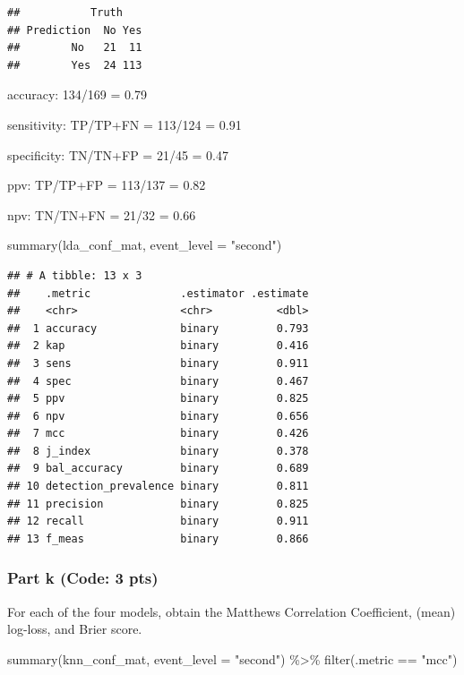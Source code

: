 \documentclass[
]{article}
\newenvironment{Shaded}{\begin{snugshade}}{\end{snugshade}}
\newcommand{\AttributeTok}[1]{\textcolor[rgb]{0.77,0.63,0.00}{#1}}
\newcommand{\FunctionTok}[1]{\textcolor[rgb]{0.00,0.00,0.00}{#1}}
\newcommand{\NormalTok}[1]{#1}
\newcommand{\SpecialCharTok}[1]{\textcolor[rgb]{0.00,0.00,0.00}{#1}}
\newcommand{\StringTok}[1]{\textcolor[rgb]{0.31,0.60,0.02}{#1}}
\begin{document}
\begin{verbatim}
##           Truth
## Prediction  No Yes
##        No   21  11
##        Yes  24 113
\end{verbatim}

accuracy: 134/169 = 0.79

sensitivity: TP/TP+FN = 113/124 = 0.91

specificity: TN/TN+FP = 21/45 = 0.47

ppv: TP/TP+FP = 113/137 = 0.82

npv: TN/TN+FN = 21/32 = 0.66

\begin{Shaded}
\begin{Highlighting}[]
\FunctionTok{summary}\NormalTok{(lda\_conf\_mat, }\AttributeTok{event\_level =} \StringTok{"second"}\NormalTok{)}
\end{Highlighting}
\end{Shaded}

\begin{verbatim}
## # A tibble: 13 x 3
##    .metric              .estimator .estimate
##    <chr>                <chr>          <dbl>
##  1 accuracy             binary         0.793
##  2 kap                  binary         0.416
##  3 sens                 binary         0.911
##  4 spec                 binary         0.467
##  5 ppv                  binary         0.825
##  6 npv                  binary         0.656
##  7 mcc                  binary         0.426
##  8 j_index              binary         0.378
##  9 bal_accuracy         binary         0.689
## 10 detection_prevalence binary         0.811
## 11 precision            binary         0.825
## 12 recall               binary         0.911
## 13 f_meas               binary         0.866
\end{verbatim}

\hypertarget{part-k-code-3-pts}{%
\subsubsection{Part k (Code: 3 pts)}\label{part-k-code-3-pts}}

For each of the four models, obtain the Matthews Correlation
Coefficient, (mean) log-loss, and Brier score.

\begin{Shaded}
\begin{Highlighting}[]
\FunctionTok{summary}\NormalTok{(knn\_conf\_mat, }\AttributeTok{event\_level =} \StringTok{"second"}\NormalTok{) }\SpecialCharTok{\%\textgreater{}\%} \FunctionTok{filter}\NormalTok{(.metric }\SpecialCharTok{==} \StringTok{"mcc"}\NormalTok{)}
\end{Highlighting}
\end{Shaded}
\end{document}
